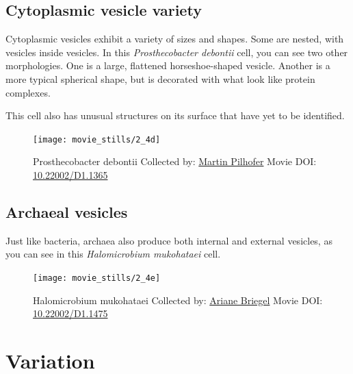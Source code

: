\documentclass[]{tufte-book}
\begin{document}
\hypertarget{Cytoplasmic_vesicle_variety}{\subsection{Cytoplasmic
vesicle variety}\label{Cytoplasmic_vesicle_variety}}

Cytoplasmic vesicles exhibit a variety of sizes and shapes. Some are
nested, with vesicles inside vesicles. In this \emph{Prosthecobacter
debontii} cell, you can see two other morphologies. One is a large,
flattened horseshoe-shaped vesicle. Another is a more typical spherical
shape, but is decorated with what look like protein complexes.

This cell also has unusual structures on its surface that have yet to be
identified.





\begin{figure}
\texttt{[image: movie\_stills/2\_4d]} \caption[Prosthecobacter debontii Collected by:
\protect\hyperlink{martin_pilhofer}{Martin Pilhofer} Movie DOI:
\href{https://doi.org/10.22002/D1.1365}{10.22002/D1.1365}]{Prosthecobacter debontii Collected by:
\protect\hyperlink{martin_pilhofer}{Martin Pilhofer} Movie DOI:
\href{https://doi.org/10.22002/D1.1365}{10.22002/D1.1365}}\label{fig:2-4d}
\end{figure}

\hypertarget{Archaeal_vesicles}{\subsection{Archaeal
vesicles}\label{Archaeal_vesicles}}

Just like bacteria, archaea also produce both internal and external
vesicles, as you can see in this \emph{Halomicrobium mukohataei} cell.





\begin{figure}
\texttt{[image: movie\_stills/2\_4e]} \caption[Halomicrobium mukohataei Collected by:
\protect\hyperlink{ariane_briegel}{Ariane Briegel} Movie DOI:
\href{https://doi.org/10.22002/D1.1475}{10.22002/D1.1475}]{Halomicrobium mukohataei Collected by:
\protect\hyperlink{ariane_briegel}{Ariane Briegel} Movie DOI:
\href{https://doi.org/10.22002/D1.1475}{10.22002/D1.1475}}\label{fig:2-4e}
\end{figure}

\section{Variation}\label{variation}
\end{document}
